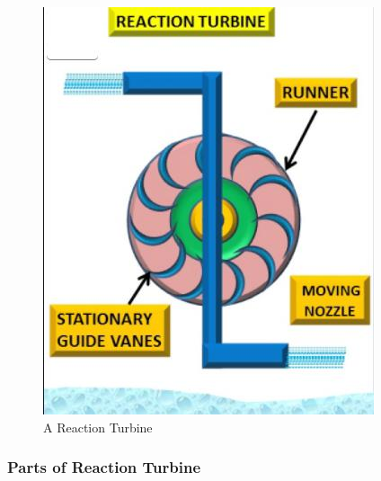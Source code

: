 \documentclass[11pt]{article}
\begin{document}
\begin{figure}[H]
	\centering
	\includegraphics[scale=0.8]{reaction turbine.jpg}
	\caption{A Reaction Turbine}
	\label{it}
\end{figure}


\subsubsection{Parts of Reaction Turbine}
\end{document}
